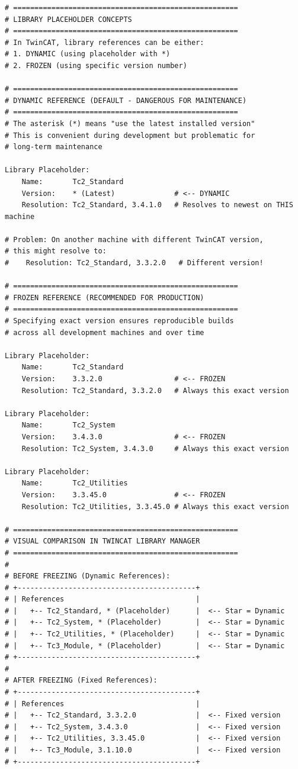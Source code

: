 \documentclass[11pt,a4paper]{article}
\begin{document}
\begin{lstlisting}[style=configstyle]
# =====================================================
# LIBRARY PLACEHOLDER CONCEPTS
# =====================================================
# In TwinCAT, library references can be either:
# 1. DYNAMIC (using placeholder with *)
# 2. FROZEN (using specific version number)

# =====================================================
# DYNAMIC REFERENCE (DEFAULT - DANGEROUS FOR MAINTENANCE)
# =====================================================
# The asterisk (*) means "use the latest installed version"
# This is convenient during development but problematic for
# long-term maintenance

Library Placeholder:
    Name:       Tc2_Standard
    Version:    * (Latest)              # <-- DYNAMIC
    Resolution: Tc2_Standard, 3.4.1.0   # Resolves to newest on THIS machine
    
# Problem: On another machine with different TwinCAT version,
# this might resolve to:
#    Resolution: Tc2_Standard, 3.3.2.0   # Different version!

# =====================================================
# FROZEN REFERENCE (RECOMMENDED FOR PRODUCTION)
# =====================================================
# Specifying exact version ensures reproducible builds
# across all development machines and over time

Library Placeholder:
    Name:       Tc2_Standard
    Version:    3.3.2.0                 # <-- FROZEN
    Resolution: Tc2_Standard, 3.3.2.0   # Always this exact version
    
Library Placeholder:
    Name:       Tc2_System
    Version:    3.4.3.0                 # <-- FROZEN
    Resolution: Tc2_System, 3.4.3.0     # Always this exact version

Library Placeholder:
    Name:       Tc2_Utilities
    Version:    3.3.45.0                # <-- FROZEN
    Resolution: Tc2_Utilities, 3.3.45.0 # Always this exact version

# =====================================================
# VISUAL COMPARISON IN TWINCAT LIBRARY MANAGER
# =====================================================
#
# BEFORE FREEZING (Dynamic References):
# +------------------------------------------+
# | References                               |
# |   +-- Tc2_Standard, * (Placeholder)      |  <-- Star = Dynamic
# |   +-- Tc2_System, * (Placeholder)        |  <-- Star = Dynamic
# |   +-- Tc2_Utilities, * (Placeholder)     |  <-- Star = Dynamic
# |   +-- Tc3_Module, * (Placeholder)        |  <-- Star = Dynamic
# +------------------------------------------+
#
# AFTER FREEZING (Fixed References):
# +------------------------------------------+
# | References                               |
# |   +-- Tc2_Standard, 3.3.2.0              |  <-- Fixed version
# |   +-- Tc2_System, 3.4.3.0                |  <-- Fixed version
# |   +-- Tc2_Utilities, 3.3.45.0            |  <-- Fixed version
# |   +-- Tc3_Module, 3.1.10.0               |  <-- Fixed version
# +------------------------------------------+
\end{lstlisting}
\end{document}
